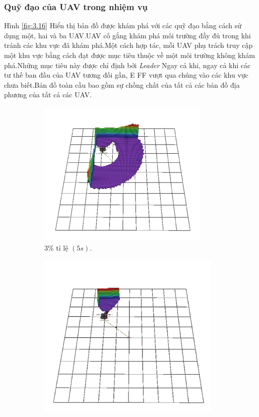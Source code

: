 \documentclass[11pt,openany]{book}
\begin{document}
\begin{algorimth}[H]
\subsubsection{Quỹ đạo của UAV trong nhiệm vụ}
Hình \ref{fig:3.16} Hiển thị bản đồ được khám phá với các quỹ đạo bằng cách sử dụng một, hai và ba UAV.UAV cố gắng khám phá môi trường đầy đủ trong khi tránh các khu vực đã khám phá.Một cách hợp tác, mỗi UAV phụ trách truy cập một khu vực bằng cách đạt được mục tiêu thuộc về một môi trường không khám phá.Những mục tiêu này được chỉ định bởi \textit{Leader} Ngay cả khi, ngay cả khi các tư thế ban đầu của UAV tương đối gần, E FF vượt qua chúng vào các khu vực chưa biết.Bản đồ toàn cầu bao gồm sự chồng chất của tất cả các bản đồ địa phương của tất cả các UAV.
\begin{figure}[H]
    \centering
    \begin{subfigure}[H]{0.3\linewidth}
        \centering
        \includegraphics[chiều rộng=\linewidth]{assets/3_13_a.png}
        \caption{{$3\%$ tỉ lệ $(5s).$}}
        \label{fig:3.13a}
    \end{subfigure}
    \begin{subfigure}[H]{0.3\linewidth}
        \centering
        \includegraphics[chiều rộng=\linewidth]{assets/3_13_b.png}

\end{subfigure}
\end{figure}
\end{algorimth}
\end{document}

